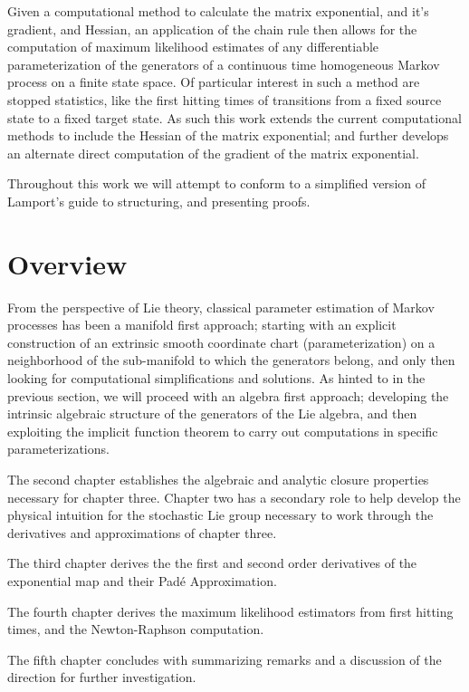 Given a computational method to calculate the matrix exponential, and it's 
gradient, and Hessian, an application of the chain rule then allows for the 
computation of maximum likelihood estimates of any differentiable
parameterization of the generators of a continuous time homogeneous Markov 
process on a finite state space. Of particular interest in such a method are stopped statistics, like the first hitting 
times of transitions from a fixed source state to a fixed target state. As such 
this work extends the current computational methods to include the Hessian of the 
matrix exponential; and further develops an alternate direct computation of the 
gradient of the matrix exponential.

Throughout this work we will attempt to conform to a simplified version of 
Lamport's guide to structuring, and presenting proofs\cite{lamport_how_2012}.

\section{Overview}
From the perspective of Lie theory, classical parameter estimation of Markov 
processes has been a manifold first approach; starting with an explicit 
construction of an extrinsic smooth coordinate chart (parameterization) on a 
neighborhood of the sub-manifold to which the generators belong, and only then 
looking for computational simplifications and solutions. As hinted to in the 
previous section, we will proceed with an algebra first approach; developing the 
intrinsic algebraic structure of the generators of the Lie algebra, and then 
exploiting the implicit function theorem to carry out computations in specific 
parameterizations.

The second chapter establishes the algebraic and analytic closure properties
necessary for chapter three. Chapter two has a secondary role to help develop the 
physical intuition for the stochastic Lie group necessary to work through the 
derivatives and approximations of chapter three.

The third chapter derives the the first and second order derivatives of the exponential
map and their Pad\'{e} Approximation.

The fourth chapter derives the maximum likelihood estimators from first hitting times, and the Newton-Raphson computation.

The fifth chapter concludes with summarizing remarks and a discussion of the direction
for further investigation.
